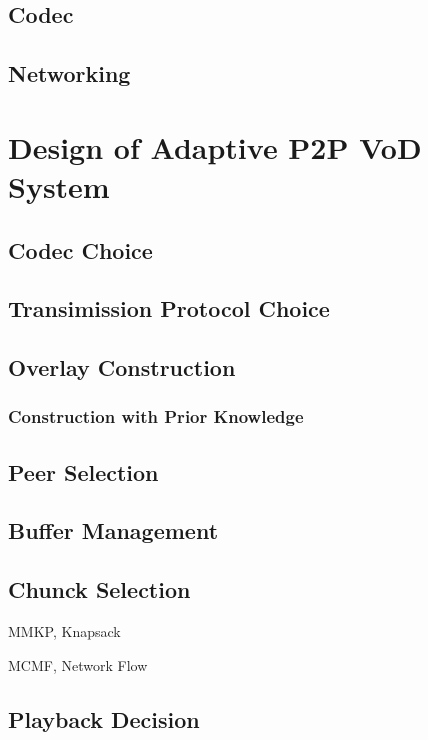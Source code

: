 \documentclass[11pt,a4paper]{article}
\begin{document}
\subsection{Codec}

\subsection{Networking}

\section{Design of Adaptive P2P VoD System}


\subsection{Codec Choice}

\subsection{Transimission Protocol Choice}


\subsection{Overlay Construction}


\subsubsection{Construction with Prior Knowledge}


\subsection{Peer Selection}


\subsection{Buffer Management}


\subsection{Chunck Selection}

MMKP, Knapsack

MCMF, Network Flow 



\subsection{Playback Decision}
\end{document}

